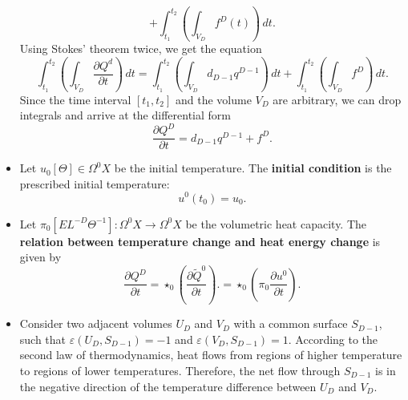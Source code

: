 \begin{discussion}
\begin{itemize}
\begin{equation}
        + \int_{t_1}^{t_2} \left(\int_{V_D} f^D(t) \right)\, d t.
      \end{equation}
      Using Stokes' theorem twice, we get the equation
      \begin{equation}
        \int_{t_1}^{t_2}
          \left(\int_{V_D} \frac{\partial Q^d}{\partial t}\right)\, d t =
          \int_{t_1}^{t_2} \left(\int_{V_D} d_{D - 1} q^{D - 1} \right)\, d t
        + \int_{t_1}^{t_2} \left(\int_{V_D} f^D \right)\, d t.
      \end{equation}
      Since the time interval $[t_1, t_2]$ and the volume $V_D$ are arbitrary,
      we can drop integrals and arrive at the differential form
      \begin{equation}
        \frac{\partial Q^D}{\partial t} = d_{D - 1} q^{D - 1} + f^D.
      \end{equation}
    \item
      Let
        $u_0 [\Theta] \in \Omega^0 X$ be the initial temperature.
      The \textbf{initial condition} is the prescribed initial temperature:
      \begin{equation}
        u^0(t_0) = u_0.
      \end{equation}
    \item
      Let $\pi_0 [E L^{-D} \Theta^{-1}] \colon \Omega^0 X \to \Omega^0 X$
      be the volumetric heat capacity.
      The \textbf{relation between temperature change and heat energy change}
      is given by
      \begin{equation}
        \frac{\partial Q^D}{\partial t}
        = \star_0 \left(\frac{\partial \tilde{Q}^0}{\partial t}\right).
        = \star_0 \left(\pi_0 \frac{\partial u^0}{\partial t}\right).
      \end{equation}
    \item
      Consider two adjacent volumes $U_D$ and $V_D$
      with a common surface $S_{D - 1}$, such that
      $\varepsilon(U_D, S_{D - 1}) = -1$ and
      $\varepsilon(V_D, S_{D - 1}) = 1$.
      According to the second law of thermodynamics, heat flows from regions of
      higher temperature to regions of lower temperatures.
      Therefore, the net flow through $S_{D - 1}$ is in the negative direction
      of the temperature difference between $U_D$ and $V_D$.
      

\end{itemize}
\end{discussion}
